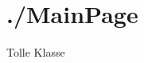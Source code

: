 \hypertarget{_8_2MainPage-example}{\section{./\-Main\-Page}
}
\-Tolle \-Klasse


\begin{DoxyCodeInclude}
\end{DoxyCodeInclude}
 
